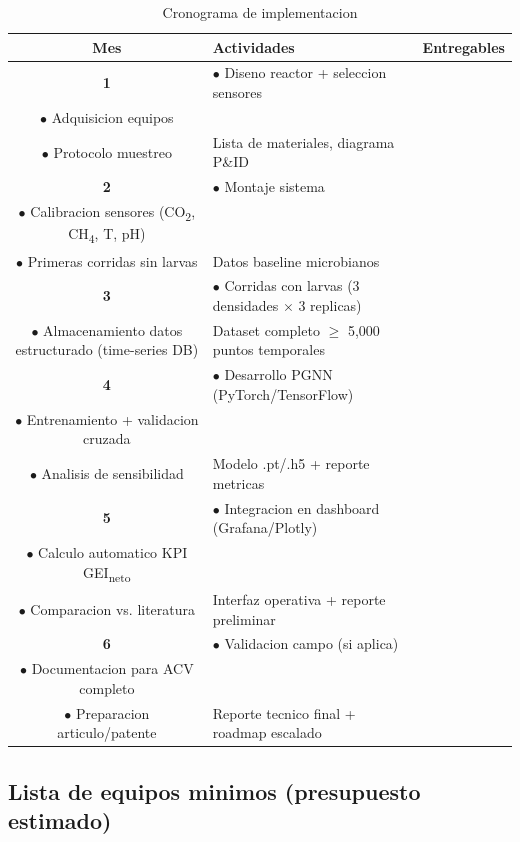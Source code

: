 \documentclass[12pt]{article}
\begin{document}
\begin{table}[H]
\centering
\caption{Cronograma de implementacion}
\label{tab:cronograma}
\begin{tabular}{|c|p{7.5cm}|p{4.5cm}|}
\hline
\textbf{Mes} & \textbf{Actividades} & \textbf{Entregables} \\ \hline
\textbf{1} & $\bullet$ Diseno reactor + seleccion sensores\\$\bullet$ Adquisicion equipos\\$\bullet$ Protocolo muestreo & Lista de materiales, diagrama P\&ID \\ \hline
\textbf{2} & $\bullet$ Montaje sistema\\$\bullet$ Calibracion sensores (CO\textsubscript{2}, CH\textsubscript{4}, T, pH)\\$\bullet$ Primeras corridas sin larvas & Datos baseline microbianos \\ \hline
\textbf{3} & $\bullet$ Corridas con larvas (3 densidades $\times$ 3 replicas)\\$\bullet$ Almacenamiento datos estructurado (time-series DB) & Dataset completo $\geq$ 5,000 puntos temporales \\ \hline
\textbf{4} & $\bullet$ Desarrollo PGNN (PyTorch/TensorFlow)\\$\bullet$ Entrenamiento + validacion cruzada\\$\bullet$ Analisis de sensibilidad & Modelo .pt/.h5 + reporte metricas \\ \hline
\textbf{5} & $\bullet$ Integracion en dashboard (Grafana/Plotly)\\$\bullet$ Calculo automatico KPI GEI\textsubscript{neto}\\$\bullet$ Comparacion vs. literatura & Interfaz operativa + reporte preliminar \\ \hline
\textbf{6} & $\bullet$ Validacion campo (si aplica)\\$\bullet$ Documentacion para ACV completo\\$\bullet$ Preparacion articulo/patente & Reporte tecnico final + roadmap escalado \\ \hline
\end{tabular}
\end{table}

\subsection{Lista de equipos minimos (presupuesto estimado)}
\end{document}
